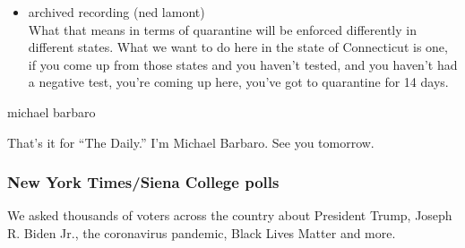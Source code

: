 \begin{itemize}
\tightlist
\item
  archived recording (ned lamont)\\
  What that means in terms of quarantine will be enforced differently in
  different states. What we want to do here in the state of Connecticut
  is one, if you come up from those states and you haven't tested, and
  you haven't had a negative test, you're coming up here, you've got to
  quarantine for 14 days.
\end{itemize}

michael barbaro

That's it for ``The Daily.'' I'm Michael Barbaro. See you tomorrow.

\hypertarget{new-york-timessiena-college-polls}{%
\subsubsection{New York Times/Siena College
polls}\label{new-york-timessiena-college-polls}}

We asked thousands of voters across the country about President Trump,
Joseph R. Biden Jr., the coronavirus pandemic, Black Lives Matter and
more.

